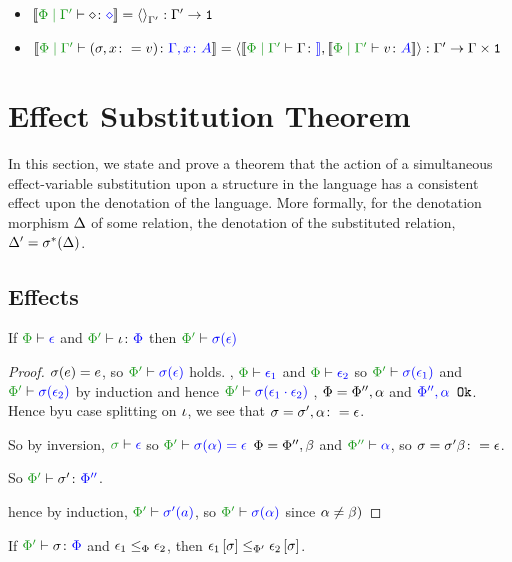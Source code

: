 \documentclass{report}
\begin{document}
\begin{itemize}
    \item $\deno{\etyperelation{\P}{\G'}{\nil}{\nil}} = \term{\G'}: \G' \rightarrow \1$
    \item $\deno{\etyperelation{\P}{\G'}{(\si, x \setto v)}{\gax}} = \pr{\deno{\etyperelation{\P}{\G'}{\G}}}{\deno{\etyperelation{\P}{\G'}{v}{A}}}: \G' \rightarrow \G\times \1$
\end{itemize}

\chapter{Effect Substitution Theorem}
In this section, we state and prove a theorem that the action of a simultaneous effect-variable substitution upon a structure in the language has a consistent effect upon the denotation of the language. More formally, for the denotation morphism $\Delta$ of some relation, the denotation of the substituted relation, $\Delta' = \sigma^*(\Delta)$.


\section{Effects}

\begin{theorem}
    If $\wellformed{\P}{\e}$ and $\typerelation{\P'}{\i}{\P}$ then $\wellformed{\P'}{\si(\e)}$   
\end{theorem}

\begin{framed}
    \begin{proof}
        $\sigma(e) = e$, so $\wellformed{\P'}{\si(\e)}$ holds.
        \bi, $\wellformed{\P}{\e_1}$ and $\wellformed{\P}{\e_2}$ so $\wellformed{\P'}{\si(\e_1)}$ and $\wellformed{\P'}{\si(\e_2)}$ by induction and hence $\wellformed{\P'}{\si(\e_1\dot\e_2)}$
        \bi, $\Phi=\Phi'',\alpha$ and ${\color{blue} \Phi'',\alpha} \texttt{ Ok}$. Hence byu case splitting on $\iota$, we see that $\sigma=\sigma', \alpha\colon=\epsilon$.
        
        So by inversion, $\wellformed{\si}{\e}$ so $\wellformed{\P'}{\si(\a)=\e}$
        \bi $\Phi=\Phi'', \beta$ and $\wellformed{\P''}{\a}$, so $\sigma=\sigma'\beta\colon=\epsilon$.
        
        So $\typerelation{\P'}{\si'}{\P''}$.
        
        hence by induction, $\wellformed{\P'}{\si'(a)}$, so $\wellformed{\P'}{\si(\a)}$ since $\alpha\neq\beta)$
    \end{proof}
    
\end{framed}
\begin{theorem}
    If $\typerelation{\P'}{\si}{\P}$ and $\epsilon_1\leq_{\Phi}\epsilon_2$, then $\epsilon_1\left[\sigma\right]\leq_{\Phi'}\epsilon_2\left[\sigma\right]$.
\end{theorem}
\end{document}
